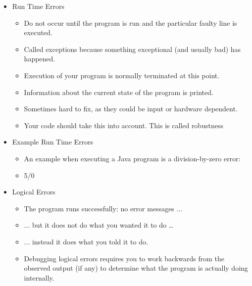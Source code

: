 \documentclass{beamer}
\begin{document}
\begin{frame}
\begin{itemize}
\item Run Time Errors
\begin{itemize}
\item Do not occur until the program is run and the particular faulty line is executed. 
\item Called exceptions because something exceptional (and usually bad) has happened. 
\item Execution of your program is normally terminated at this point. 
\item Information about the current state of the program is printed. 
\item Sometimes hard to fix, as they could be input or hardware dependent. 
\item Your code should take this into account. This is called \textcolor[rgb]{0.26666668,0.0,0.5176471}{robustness }
\end{itemize}
\end{itemize}
\end{frame}

\begin{frame}
\begin{itemize}
\item Example Run Time Errors
\begin{itemize}
\item An example when executing a Java program is a division-by-zero error:
\item 5/0 
\end{itemize}
\end{itemize}
\end{frame}

\begin{frame}
\begin{itemize}
\item Logical Errors
\begin{itemize}
\item The program runs successfully: no error messages ... 
\item ... but it does not do what you wanted it to do {\dots}
\item ... instead it does what you told it to do. 
\item Debugging logical errors requires you to work backwards from the observed output (if any) to determine what the program is actually doing internally. 
\end{itemize}
\end{itemize}	
\end{frame}
\end{document}
